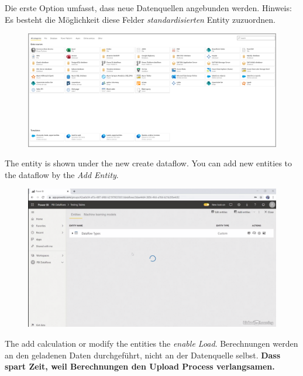 Die erste Option umfasst, dass neue Datenquellen angebunden werden. Hinweis: Es besteht die Möglichkeit diese Felder \textit{standardisierten} Entity zuzuordnen. 

\begin{figure}[H]
	\centering
	\includegraphics[scale = 0.3]{attachment/chapter_1/Scc141}
\end{figure}

The entity is shown under the new create dataflow. You can add new entities to the dataflow by the \textit{Add Entity}.

\begin{figure}[H]
	\centering
	\includegraphics[scale = 0.3]{attachment/chapter_1/Scc140}
\end{figure}

The add calculation or modify the entities the \textit{enable Load}. Berechnungen werden an den geladenen Daten durchgeführt, nicht an der Datenquelle selbst. 
\textbf{Dass spart Zeit, weil Berechnungen den Upload Process verlangsamen.} 

